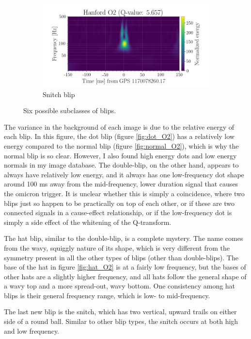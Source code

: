 \documentclass[a4paper]{article}
\begin{document}
\begin{figure}[h!]
\begin{subfigure}{.49\textwidth}
		\centering
		\includegraphics[width=1\linewidth]{snitch_O2}
		\caption{Snitch blip}
		\label{fig:snitch_O2}
	\end{subfigure}
	\caption{Six possible subclasses of blips.}
	\label{fig:six}
\end{figure}

The variance in the background of each image is due to the relative energy of each blip. In this figure, the dot blip (figure \ref{fig:dot_O2}) has a relatively low energy compared to the normal blip (figure \ref{fig:normal_O2}), which is why the normal blip is so clear. However, I also found high energy dots and low energy normals in my image database. The double-blip, on the other hand, appears to always have relatively low energy, and it always has one low-frequency dot shape around 100 ms away from the mid-frequency, lower duration signal that causes the omicron trigger. It is unclear whether this is simply a coincidence, where two blips just so happen to be practically on top of each other, or if these are two connected signals in a cause-effect relationship, or if the low-frequency dot is simply a side effect of the whitening of the Q-transform.

The hat blip, similar to the double-blip, is a complete mystery. The name comes from the wavy, squiggly nature of its shape, which is very different from the symmetry present in all the other types of blips (other than double-blips). The base of the hat in figure \ref{fig:hat_O2} is at a fairly low frequency, but the bases of other hats are a slightly higher frequency, and all hats follow the general shape of a wavy top and a more spread-out, wavy bottom. One consistency among hat blips is their general frequency range, which is low- to mid-frequency.

The last new blip is the snitch, which has two vertical, upward trails on either side of a round ball. Similar to other blip types, the snitch occurs at both high and low frequency. 
\end{document}
